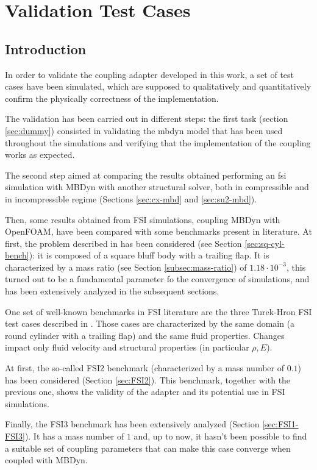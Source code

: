 \chapter{Validation Test Cases}
\label{cha:tests}


\section{Introduction}

In order to validate the coupling adapter developed in this work, a set of test cases have been simulated, which are supposed to qualitatively and quantitatively confirm the physically correctness of the implementation.

The validation has been carried out in different steps: the first task (section \ref{sec:dummy}) consisted in validating the \acrshort{mbdyn} model that has been used throughout the simulations and verifying that the implementation of the coupling works as expected.

The second step aimed at comparing the results obtained performing an \acrshort{fsi} simulation with MBDyn with another structural solver, both in compressible and in incompressible regime (Sections \ref{sec:cx-mbd} and \ref{sec:su2-mbd}).

Then, some results obtained from FSI simulations, coupling MBDyn with OpenFOAM, have been compared with some benchmarks present in literature. At first, the problem described in \cite{ramm1998fluid} has been considered (see Section \ref{sec:sq-cyl-bench}): it is composed of a square bluff body with a trailing flap. It is characterized by a mass ratio (see Section \ref{subsec:mass-ratio}) of $1.18\cdot 10^{-3}$, this turned out to be a fundamental parameter fo the convergence of simulations, and has been extensively analyzed in the subsequent sections.

One set of well-known benchmarks in FSI literature are the three Turek-Hron FSI test cases described in \cite{turek2006proposal}. Those cases are characterized by the same domain (a round cylinder with a trailing flap) and the same fluid properties. Changes impact only fluid velocity and structural properties (in particular $\rho,E$).

At first, the so-called FSI2 benchmark (characterized by a mass number of $0.1$) has been considered (Section \ref{sec:FSI2}). This benchmark, together with the previous one, shows the validity of the adapter and its potential use in FSI simulations.

Finally, the FSI3 benchmark has been extensively analyzed (Section \ref{sec:FSI1-FSI3}). It has a mass number of $1$ and, up to now, it hasn't been possible to find a suitable set of coupling parameters that can make this case converge when coupled with MBDyn.

